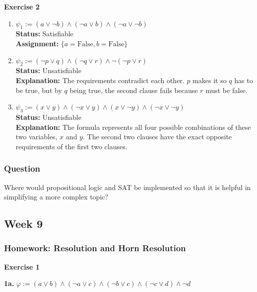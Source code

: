 \documentclass{article}
\theoremstyle{theorem}
\theoremstyle{definition}
\theoremstyle{remark}
\begin{document}
\textbf{Exercise 2}
\begin{enumerate}
    \item \textbf{$\psi_1 := (a \vee \neg b) \wedge (\neg a \vee b) \wedge (\neg a \vee \neg b)$} \\
    \textbf{Status:} Satisfiable \\
    \textbf{Assignment:} $\{a = \text{False}, b = \text{False}\}$

    \item \textbf{$\psi_2 := (\neg p \vee q) \wedge (\neg q \vee r) \wedge \neg(\neg p \vee r)$} \\
    \textbf{Status:} Unsatisfiable \\
    \textbf{Explanation:} The requirements contradict each other. $p$ makes it so $q$ has to be true, but by $q$ being true, the second clause fails because $r$ must be false.

    \item \textbf{$\psi_3 := (x \vee y) \wedge (\neg x \vee y) \wedge (x \vee \neg y) \wedge (\neg x \vee \neg y)$} \\
    \textbf{Status:} Unsatisfiable \\
    \textbf{Explanation:} The formula represents all four possible combinations of these two variables, $x$ and $y$. The second two clauses have the exact opposite requirements of the first two clauses.
\end{enumerate}

\subsubsection{Question}
Where would propositional logic and SAT be implemented so that it is helpful in simplifying a more complex topic?

\subsection{Week 9}

\subsubsection{Homework: Resolution and Horn Resolution}

\textbf{Exercise 1}

\textbf{1a.}
$\varphi := (a \vee b) \wedge (\neg a \vee c) \wedge (\neg b \vee c) \wedge (\neg c \vee d) \wedge \neg d$
\end{document}

